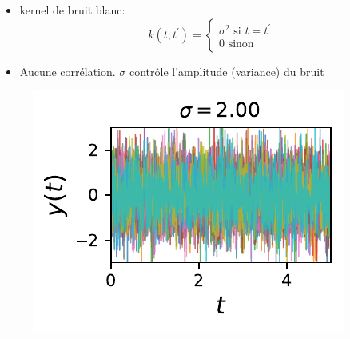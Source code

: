 \documentclass[xcolor=svgnames, t]{beamer}
\begin{document}
\begin{frame}{\subsecname}
  \begin{itemize}
    \item<1-> kernel de bruit blanc: 
    \begin{equation*}
        k(t, t^\prime) = 
        \left\{
          \begin{array}{ll}
            \sigma^2  \text{ si } t = t^\prime \\
            0 \text{ sinon }
          \end{array}
        \right.
    \end{equation*}
    \item<1-> Aucune corrélation. $\sigma$ contrôle l'amplitude (variance) du bruit
  \end{itemize}
  \begin{figure}
    \includegraphics{10_gp_time_WhiteKernel_2.00.pdf}%
  \end{figure}
\end{frame}
\end{document}
